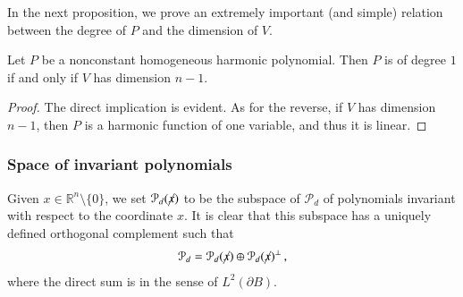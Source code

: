 \documentclass[11pt]{article}
\begin{document}
In the next proposition, we prove an extremely important (and simple) relation between the degree of $P$ and the dimension of $V$.
\begin{proposition}\label{prop_pn-2}
 Let $P$ be a nonconstant homogeneous harmonic polynomial. Then $P$ is of degree $1$ if and only if $V$ has dimension $n-1$.
\end{proposition}
\begin{proof}
 The direct implication is evident. As for the reverse, if $V$ has dimension $n-1$, then $P$ is a harmonic function of one variable, and thus it is linear.
\end{proof}

\subsubsection{Space of invariant polynomials}
\begin{definition}
 Given $x\in {\mathbb{R}}^n\setminus \{0\}$, we set ${\mathcal{P}}_d(\cancel x)$ to be the subspace of ${\mathcal{P}}_d$ of polynomials invariant with respect to the coordinate $x$. It is clear that this subspace has a uniquely defined orthogonal complement such that
 \begin{gather}
  {\mathcal{P}}_d = {\mathcal{P}}_d(\cancel x) \oplus {\mathcal{P}}_d(\cancel x)^\perp\, ,
 \end{gather}
 where the direct sum is in the sense of $L^2(\partial B)$.
\end{definition}
\end{document}
